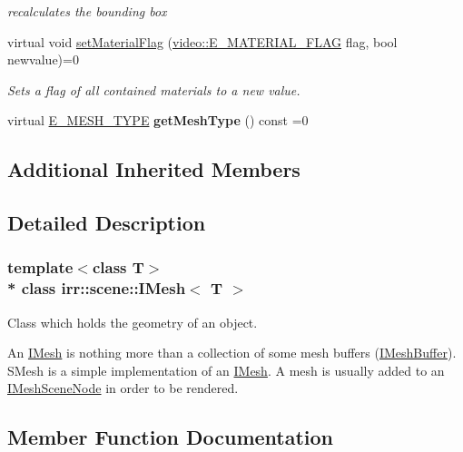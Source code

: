 \begin{DoxyCompactItemize}
\begin{DoxyCompactList}\small\item\em recalculates the bounding box \end{DoxyCompactList}\item 
virtual void \hyperlink{classirr_1_1scene_1_1IMesh_a3e7e9c201ad12e33d1387b11fb1409f0}{set\+Material\+Flag} (\hyperlink{namespaceirr_1_1video_a8a3bc00ae8137535b9fbc5f40add70d3}{video\+::\+E\+\_\+\+M\+A\+T\+E\+R\+I\+A\+L\+\_\+\+F\+L\+AG} flag, bool newvalue)=0
\begin{DoxyCompactList}\small\item\em Sets a flag of all contained materials to a new value. \end{DoxyCompactList}\item 
virtual \hyperlink{namespaceirr_1_1scene_aef0400177e5941293dff6640e800d11b}{E\+\_\+\+M\+E\+S\+H\+\_\+\+T\+Y\+PE} {\bfseries get\+Mesh\+Type} () const  =0\hypertarget{classirr_1_1scene_1_1IMesh_ab7f1e7e39c225a1f2bd13f96f6429aa0}{}\label{classirr_1_1scene_1_1IMesh_ab7f1e7e39c225a1f2bd13f96f6429aa0}

\end{DoxyCompactItemize}
\subsection*{Additional Inherited Members}


\subsection{Detailed Description}
\subsubsection*{template$<$class T$>$\\*
class irr\+::scene\+::\+I\+Mesh$<$ T $>$}

Class which holds the geometry of an object. 

An \hyperlink{classirr_1_1scene_1_1IMesh}{I\+Mesh} is nothing more than a collection of some mesh buffers (\hyperlink{classirr_1_1scene_1_1IMeshBuffer}{I\+Mesh\+Buffer}). S\+Mesh is a simple implementation of an \hyperlink{classirr_1_1scene_1_1IMesh}{I\+Mesh}. A mesh is usually added to an \hyperlink{classirr_1_1scene_1_1IMeshSceneNode}{I\+Mesh\+Scene\+Node} in order to be rendered. 

\subsection{Member Function Documentation}

